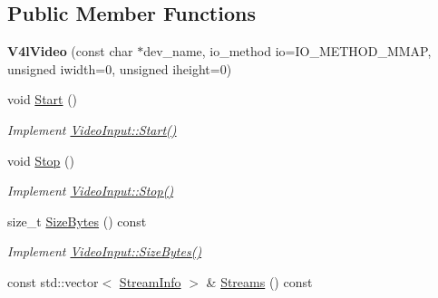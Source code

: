 \subsection*{Public Member Functions}
\begin{DoxyCompactItemize}
\item 
{\bfseries V4l\+Video} (const char $\ast$dev\+\_\+name, io\+\_\+method io=I\+O\+\_\+\+M\+E\+T\+H\+O\+D\+\_\+\+M\+M\+AP, unsigned iwidth=0, unsigned iheight=0)\hypertarget{classpangolin_1_1_v4l_video_add684f4b5f825d3e9e13dfe4999e00e8}{}\label{classpangolin_1_1_v4l_video_add684f4b5f825d3e9e13dfe4999e00e8}

\item 
void \hyperlink{classpangolin_1_1_v4l_video_a3fde2862c5ae32d61a95d9ed1ec88727}{Start} ()\hypertarget{classpangolin_1_1_v4l_video_a3fde2862c5ae32d61a95d9ed1ec88727}{}\label{classpangolin_1_1_v4l_video_a3fde2862c5ae32d61a95d9ed1ec88727}

\begin{DoxyCompactList}\small\item\em Implement \hyperlink{structpangolin_1_1_video_input_a74a2e3e1b87c7cbf9de9bcb39e1df128}{Video\+Input\+::\+Start()} \end{DoxyCompactList}\item 
void \hyperlink{classpangolin_1_1_v4l_video_a421f6b476a958eaaddccac15f1671dee}{Stop} ()\hypertarget{classpangolin_1_1_v4l_video_a421f6b476a958eaaddccac15f1671dee}{}\label{classpangolin_1_1_v4l_video_a421f6b476a958eaaddccac15f1671dee}

\begin{DoxyCompactList}\small\item\em Implement \hyperlink{structpangolin_1_1_video_input_a8945f80194cc7ec9594db7f27e7d09b8}{Video\+Input\+::\+Stop()} \end{DoxyCompactList}\item 
size\+\_\+t \hyperlink{classpangolin_1_1_v4l_video_ab073c30badb88d77a31f693fe2f1c95f}{Size\+Bytes} () const \hypertarget{classpangolin_1_1_v4l_video_ab073c30badb88d77a31f693fe2f1c95f}{}\label{classpangolin_1_1_v4l_video_ab073c30badb88d77a31f693fe2f1c95f}

\begin{DoxyCompactList}\small\item\em Implement \hyperlink{structpangolin_1_1_video_input_a93cee5c33386973a2a51165e6bdcf40b}{Video\+Input\+::\+Size\+Bytes()} \end{DoxyCompactList}\item 
const std\+::vector$<$ \hyperlink{classpangolin_1_1_stream_info}{Stream\+Info} $>$ \& \hyperlink{classpangolin_1_1_v4l_video_a74fc01f7e4ff5261a760b6a223feead9}{Streams} () const \hypertarget{classpangolin_1_1_v4l_video_a74fc01f7e4ff5261a760b6a223feead9}{}\label{classpangolin_1_1_v4l_video_a74fc01f7e4ff5261a760b6a223feead9}


\end{DoxyCompactItemize}
